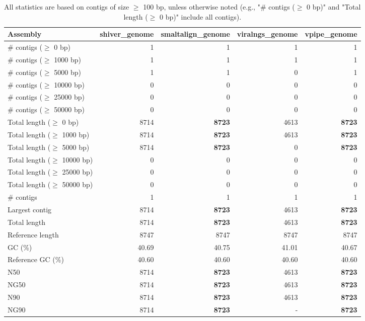 \documentclass[12pt,a4paper]{article}
\begin{document}
\begin{table}[ht]
\begin{center}
\caption{All statistics are based on contigs of size $\geq$ 100 bp, unless otherwise noted (e.g., "\# contigs ($\geq$ 0 bp)" and "Total length ($\geq$ 0 bp)" include all contigs).}
\begin{tabular}{|l*{4}{|r}|}
\hline
Assembly & shiver\_genome & smaltalign\_genome & viralngs\_genome & vpipe\_genome \\ \hline
\# contigs ($\geq$ 0 bp) & 1 & 1 & 1 & 1 \\ \hline
\# contigs ($\geq$ 1000 bp) & 1 & 1 & 1 & 1 \\ \hline
\# contigs ($\geq$ 5000 bp) & 1 & 1 & 0 & 1 \\ \hline
\# contigs ($\geq$ 10000 bp) & 0 & 0 & 0 & 0 \\ \hline
\# contigs ($\geq$ 25000 bp) & 0 & 0 & 0 & 0 \\ \hline
\# contigs ($\geq$ 50000 bp) & 0 & 0 & 0 & 0 \\ \hline
Total length ($\geq$ 0 bp) & 8714 & {\bf 8723} & 4613 & {\bf 8723} \\ \hline
Total length ($\geq$ 1000 bp) & 8714 & {\bf 8723} & 4613 & {\bf 8723} \\ \hline
Total length ($\geq$ 5000 bp) & 8714 & {\bf 8723} & 0 & {\bf 8723} \\ \hline
Total length ($\geq$ 10000 bp) & 0 & 0 & 0 & 0 \\ \hline
Total length ($\geq$ 25000 bp) & 0 & 0 & 0 & 0 \\ \hline
Total length ($\geq$ 50000 bp) & 0 & 0 & 0 & 0 \\ \hline
\# contigs & 1 & 1 & 1 & 1 \\ \hline
Largest contig & 8714 & {\bf 8723} & 4613 & {\bf 8723} \\ \hline
Total length & 8714 & {\bf 8723} & 4613 & {\bf 8723} \\ \hline
Reference length & 8747 & 8747 & 8747 & 8747 \\ \hline
GC (\%) & 40.69 & 40.75 & 41.01 & 40.67 \\ \hline
Reference GC (\%) & 40.60 & 40.60 & 40.60 & 40.60 \\ \hline
N50 & 8714 & {\bf 8723} & 4613 & {\bf 8723} \\ \hline
NG50 & 8714 & {\bf 8723} & 4613 & {\bf 8723} \\ \hline
N90 & 8714 & {\bf 8723} & 4613 & {\bf 8723} \\ \hline
NG90 & 8714 & {\bf 8723} & - & {\bf 8723} \\ \hline

\end{tabular}
\end{center}
\end{table}
\end{document}
